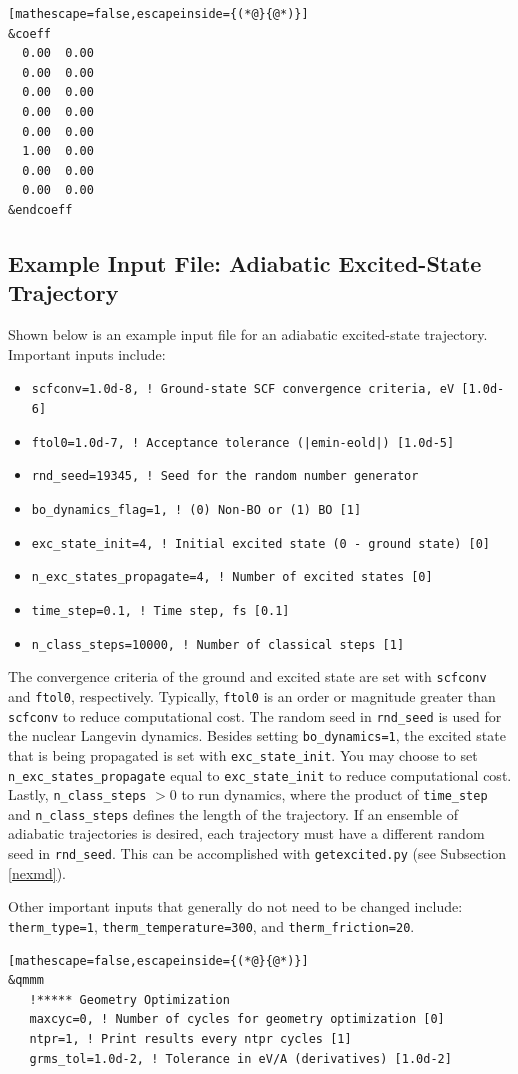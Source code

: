 \documentclass[letterpaper,12pt,titlepage]{article}
\begin{document}
\begin{appendix}
\begin{lstlisting}[mathescape=false,escapeinside={(*@}{@*)}]
&coeff
  0.00  0.00
  0.00  0.00
  0.00  0.00
  0.00  0.00
  0.00  0.00
  1.00  0.00
  0.00  0.00
  0.00  0.00
&endcoeff
\end{lstlisting}
\newpage
\subsection{Example Input File: Adiabatic Excited-State Trajectory}
\label{input_amd}
Shown below is an example input file for an adiabatic excited-state trajectory.  Important inputs include:
\begin{itemize}
\item \verb+scfconv=1.0d-8, ! Ground-state SCF convergence criteria, eV [1.0d-6]+
\item \verb+ftol0=1.0d-7, ! Acceptance tolerance (|emin-eold|) [1.0d-5]+
\item \verb+rnd_seed=19345, ! Seed for the random number generator+
\item \verb+bo_dynamics_flag=1, ! (0) Non-BO or (1) BO [1]+
\item \verb+exc_state_init=4, ! Initial excited state (0 - ground state) [0]+
\item \verb+n_exc_states_propagate=4, ! Number of excited states [0]+
\item \verb+time_step=0.1, ! Time step, fs [0.1]+
\item \verb+n_class_steps=10000, ! Number of classical steps [1]+
\end{itemize}
The convergence criteria of the ground and excited state are set with \verb+scfconv+ and \verb+ftol0+, respectively.  Typically, \verb+ftol0+ is an order or magnitude greater than \verb+scfconv+ to reduce computational cost.  The random seed in \verb+rnd_seed+ is used for the nuclear Langevin dynamics.  Besides setting \verb+bo_dynamics=1+, the excited state that is being propagated is set with \verb+exc_state_init+.  You may choose to set \verb+n_exc_states_propagate+ equal to \verb+exc_state_init+ to reduce computational cost.  Lastly, \verb+n_class_steps+ $>0$ to run dynamics, where the product of \verb+time_step+ and \verb+n_class_steps+ defines the length of the trajectory.  If an ensemble of adiabatic trajectories is desired, each trajectory must have a different random seed in \verb+rnd_seed+.  This can be accomplished with \verb+getexcited.py+ (see Subsection \ref{nexmd}).

Other important inputs that generally do not need to be changed include: \verb+therm_type=1+, \verb+therm_temperature=300+, and \verb+therm_friction=20+.
\begin{lstlisting}[mathescape=false,escapeinside={(*@}{@*)}]
&qmmm
   !***** Geometry Optimization
   maxcyc=0, ! Number of cycles for geometry optimization [0]
   ntpr=1, ! Print results every ntpr cycles [1]
   grms_tol=1.0d-2, ! Tolerance in eV/A (derivatives) [1.0d-2]


\end{lstlisting}
\end{appendix}
\end{document}
